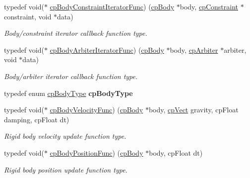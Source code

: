 \begin{DoxyCompactItemize}
\mbox{\label{group__cpBody_ga8cacab9a606b0dbb1dad405bb0d7ba12}} 
typedef void($\ast$ \hyperlink{group__cpBody_ga8cacab9a606b0dbb1dad405bb0d7ba12}{cp\+Body\+Constraint\+Iterator\+Func}) (\hyperlink{structcpBody}{cp\+Body} $\ast$body, \hyperlink{structcpConstraint}{cp\+Constraint} $\ast$constraint, void $\ast$data)
\begin{DoxyCompactList}\small\item\em Body/constraint iterator callback function type. \end{DoxyCompactList}\item 
\mbox{\label{group__cpBody_gac655e03d7b2d7fd0a870a702f9de0026}} 
typedef void($\ast$ \hyperlink{group__cpBody_gac655e03d7b2d7fd0a870a702f9de0026}{cp\+Body\+Arbiter\+Iterator\+Func}) (\hyperlink{structcpBody}{cp\+Body} $\ast$body, \hyperlink{structcpArbiter}{cp\+Arbiter} $\ast$arbiter, void $\ast$data)
\begin{DoxyCompactList}\small\item\em Body/arbiter iterator callback function type. \end{DoxyCompactList}\item 
\mbox{\label{group__cpBody_ga45565578b1dfe055f40930f24506807a}} 
typedef enum \hyperlink{group__cpBody_ga3581b128fd3e2734952aeac8545fd5ca}{cp\+Body\+Type} {\bfseries cp\+Body\+Type}
\item 
\mbox{\label{group__cpBody_gaa7a1f4706fb8e879c356ae99035ead71}} 
typedef void($\ast$ \hyperlink{group__cpBody_gaa7a1f4706fb8e879c356ae99035ead71}{cp\+Body\+Velocity\+Func}) (\hyperlink{structcpBody}{cp\+Body} $\ast$body, \hyperlink{structcpVect}{cp\+Vect} gravity, cp\+Float damping, cp\+Float dt)
\begin{DoxyCompactList}\small\item\em Rigid body velocity update function type. \end{DoxyCompactList}\item 
\mbox{\label{group__cpBody_ga3386e3b0b4156289ab6099cc64c952e7}} 
typedef void($\ast$ \hyperlink{group__cpBody_ga3386e3b0b4156289ab6099cc64c952e7}{cp\+Body\+Position\+Func}) (\hyperlink{structcpBody}{cp\+Body} $\ast$body, cp\+Float dt)
\begin{DoxyCompactList}\small\item\em Rigid body position update function type. \end{DoxyCompactList}\item 

\end{DoxyCompactItemize}
